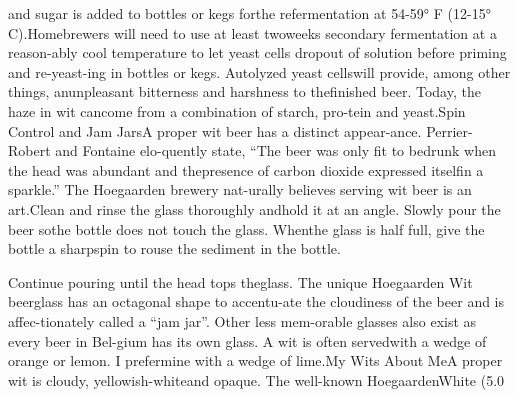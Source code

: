 \documentclass[a4paper,parskip=half]{scrartcl}
\begin{document}
\parencite[32]{Sparrow2002} 

and sugar is added to bottles or kegs forthe refermentation at 54-59° F (12-15° C).Homebrewers will need to use at least twoweeks secondary fermentation at a reason-ably cool temperature to let yeast cells dropout of solution before priming and re-yeast-ing in bottles or kegs. Autolyzed yeast cellswill provide, among other things, anunpleasant bitterness and harshness to thefinished beer. Today, the haze in wit cancome from a combination of starch, pro-tein and yeast.Spin Control and Jam JarsA proper wit beer has a distinct appear-ance. Perrier-Robert and Fontaine elo-quently state, “The beer was only fit to bedrunk when the head was abundant and thepresence of carbon dioxide expressed itselfin a sparkle.” The Hoegaarden brewery nat-urally believes serving wit beer is an art.Clean and rinse the glass thoroughly andhold it at an angle. Slowly pour the beer sothe bottle does not touch the glass. Whenthe glass is half full, give the bottle a sharpspin to rouse the sediment in the bottle.

\parencite[33]{Sparrow2002} 

Continue pouring until the head tops theglass. The unique Hoegaarden Wit beerglass has an octagonal shape to accentu-ate the cloudiness of the beer and is affec-tionately called a “jam jar”. Other less mem-orable glasses also exist as every beer in Bel-gium has its own glass. A wit is often servedwith a wedge of orange or lemon. I prefermine with a wedge of lime.My Wits About MeA proper wit is cloudy, yellowish-whiteand opaque. The well-known HoegaardenWhite (5.0%
\end{document}
